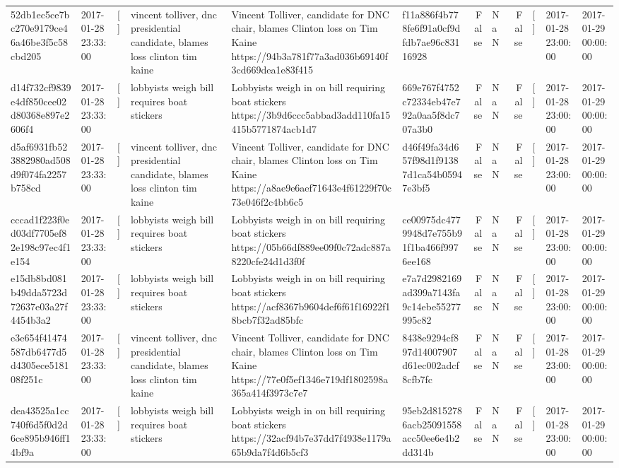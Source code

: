 \begin{tabular}{llllllrlrlll}
52db1ec5ce7bc270e9179ce46a46be3f5c58cbd205 & 2017-01-28 23:33:00 & [] & vincent tolliver, dnc presidential candidate, blames loss clinton tim kaine & Vincent Tolliver, candidate for DNC chair, blames Clinton loss on Tim Kaine https://94b3a781f77a3ad036b69140f3cd669dea1e83f415 & f11a886f4b778fe6f91a0cf9dfdb7ae96c83116928 & False & NaN & False & [] & 2017-01-28 23:00:00 & 2017-01-29 00:00:00 \\
d14f732cf9839e4df850cee02d80368e897e2606f4 & 2017-01-28 23:33:00 & [] & lobbyists weigh bill requires boat stickers & Lobbyists weigh in on bill requiring boat stickers https://3b9d6ccc5abbad3add110fa15415b5771874acb1d7 & 669e767f4752c72334eb47e792a0aa5f8dc707a3b0 & False & NaN & False & [] & 2017-01-28 23:00:00 & 2017-01-29 00:00:00 \\
d5af6931fb523882980ad508d9f074fa2257b758cd & 2017-01-28 23:33:00 & [] & vincent tolliver, dnc presidential candidate, blames loss clinton tim kaine & Vincent Tolliver, candidate for DNC chair, blames Clinton loss on Tim Kaine https://a8ae9e6aef71643e4f61229f70c73e046f2c4bb6c5 & d46f49fa34d657f98d1f91387d1ca54b05947e3bf5 & False & NaN & False & [] & 2017-01-28 23:00:00 & 2017-01-29 00:00:00 \\
cccad1f223f0ed03df7705ef82e198c97ec4f1e154 & 2017-01-28 23:33:00 & [] & lobbyists weigh bill requires boat stickers & Lobbyists weigh in on bill requiring boat stickers https://05b66df889ee09f0c72adc887a8220cfe24d1d3f0f & ce00975dc4779948d7e755b91f1ba466f9976ee168 & False & NaN & False & [] & 2017-01-28 23:00:00 & 2017-01-29 00:00:00 \\
e15db8bd081b49dda5723d72637e03a27f4454b3a2 & 2017-01-28 23:33:00 & [] & lobbyists weigh bill requires boat stickers & Lobbyists weigh in on bill requiring boat stickers https://acf8367b9604def6f61f16922f18bcb7f32ad85bfc & e7a7d2982169ad399a7143fa9c14ebe55277995c82 & False & NaN & False & [] & 2017-01-28 23:00:00 & 2017-01-29 00:00:00 \\
e3e654f41474587db6477d5d4305ece518108f251c & 2017-01-28 23:33:00 & [] & vincent tolliver, dnc presidential candidate, blames loss clinton tim kaine & Vincent Tolliver, candidate for DNC chair, blames Clinton loss on Tim Kaine https://77e0f5ef1346e719df1802598a365a414f3973c7e7 & 8438e9294cf897d14007907d61ec002adcf8cfb7fc & False & NaN & False & [] & 2017-01-28 23:00:00 & 2017-01-29 00:00:00 \\
dea43525a1cc740f6d5f0d2d6ce895b946ff14bf9a & 2017-01-28 23:33:00 & [] & lobbyists weigh bill requires boat stickers & Lobbyists weigh in on bill requiring boat stickers https://32acf94b7e37dd7f4938e1179a65b9da7f4d6b5cf3 & 95eb2d8152786acb25091558acc50ee6e4b2dd314b & False & NaN & False & [] & 2017-01-28 23:00:00 & 2017-01-29 00:00:00 \\

\end{tabular}
